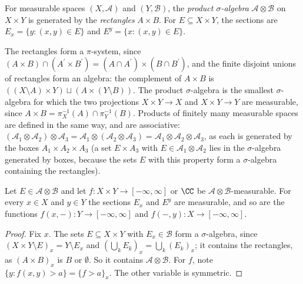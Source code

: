 \begin{definition}\label{measure-theory:definition-product-measure}
For measurable spaces $(X, \mathcal{A})$ and $(Y, \mathcal{B})$, the \emph{product $\sigma$-algebra} $\mathcal{A} \otimes \mathcal{B}$ on $X \times Y$ is generated by the \emph{rectangles} $A \times B$. For
$E \subseteq X \times Y$, the sections are $E_x = \{y : (x, y) \in E\}$ and $E^y = \{x : (x, y) \in E\}$.
\end{definition}

The rectangles form a $\pi$-system, since $(A \times B) \cap (A^{\prime} \times B^{\prime}) = (A \cap A^{\prime}) \times (B \cap B^{\prime})$, and the finite disjoint unions of rectangles form an algebra:
the complement of $A \times B$ is $((X \setminus A) \times Y) \sqcup (A \times (Y \setminus B))$. The product $\sigma$-algebra is the smallest $\sigma$-algebra for which the two projections
$X \times Y \to X$ and $X \times Y \to Y$ are measurable, since $A \times B = \pi_X^{-1}(A) \cap \pi_Y^{-1}(B)$. Products of finitely many measurable spaces are defined in the same way, and are
associative: $(\mathcal{A}_1 \otimes \mathcal{A}_2) \otimes \mathcal{A}_3 = \mathcal{A}_1 \otimes (\mathcal{A}_2 \otimes \mathcal{A}_3) = \mathcal{A}_1 \otimes \mathcal{A}_2 \otimes \mathcal{A}_3$, as each is generated by
the boxes $A_1 \times A_2 \times A_3$ (a set $E \times A_3$ with $E \in \mathcal{A}_1 \otimes \mathcal{A}_2$ lies in the $\sigma$-algebra generated by boxes, because the sets $E$ with this property form a
$\sigma$-algebra containing the rectangles).

\begin{lemma}\label{measure-theory:lemma-sections}
Let $E \in \mathcal{A} \otimes \mathcal{B}$ and let $f \colon X \times Y \to [-\infty, \infty]$ or $\CC$ be $\mathcal{A} \otimes \mathcal{B}$-measurable. For every $x \in X$ and $y \in Y$ the sections
$E_x$ and $E^y$ are measurable, and so are the functions $f(x, -) \colon Y \to [-\infty, \infty]$ and $f(-, y) \colon X \to [-\infty, \infty]$.
\end{lemma}

\begin{proof}
Fix $x$. The sets $E \subseteq X \times Y$ with $E_x \in \mathcal{B}$ form a $\sigma$-algebra, since $(X \times Y \setminus E)_x = Y \setminus E_x$ and $(\bigcup_kE_k)_x = \bigcup_k(E_k)_x$; it contains the
rectangles, as $(A \times B)_x$ is $B$ or $\emptyset$. So it contains $\mathcal{A} \otimes \mathcal{B}$. For $f$, note $\{y : f(x, y) > a\} = \{f > a\}_x$. The other variable is symmetric.
\end{proof}

